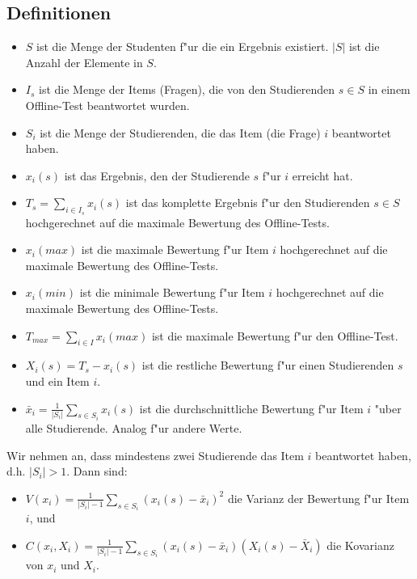 \documentclass[12pt]{report}
\begin{document}
\subsection{Definitionen}
\label{subsubsec:definitions}
\begin{itemize}
\item $S$ ist die Menge der Studenten f"ur die ein Ergebnis existiert. $|S|$ ist die Anzahl der Elemente in $S$.
\item $I_s$ ist die Menge der Items (Fragen), die von den Studierenden $s\in S$ in einem Offline-Test beantwortet wurden.
\item $S_i$ ist die Menge der Studierenden, die das Item (die Frage) $i$ beantwortet haben.
\item $x_i(s)$ ist das Ergebnis, den der Studierende $s$ f"ur $i$ erreicht hat.
\item $T_s = \sum\limits_{i\in I_s} x_i(s)$ ist das komplette Ergebnis f"ur den Studierenden $s\in S$ hochgerechnet auf die maximale Bewertung des Offline-Tests.
\item $x_i(max)$ ist die maximale Bewertung f"ur Item $i$ hochgerechnet auf die maximale Bewertung des Offline-Tests. 
\item $x_i(min)$ ist die minimale Bewertung f"ur Item $i$ hochgerechnet auf die maximale Bewertung des Offline-Tests. 
\item $T_{max}=\sum\limits_{i\in I} x_i(max)$ ist die maximale Bewertung f"ur den Offline-Test.
\item $X_i(s) = T_s - x_i(s)$ ist die restliche Bewertung f"ur einen Studierenden $s$ und ein Item $i$.
\item $\bar{x}_i = \frac{1}{|S_i|}\sum\limits_{s\in S_i}x_i(s)$ ist die durchschnittliche Bewertung f"ur Item $i$ "uber alle Studierende. Analog f"ur andere Werte.
\end{itemize}

Wir nehmen an, dass mindestens zwei Studierende das Item $i$ beantwortet haben, d.h. $|S_i| > 1$.
Dann sind:
\begin{itemize}
\item $V(x_i) = \frac{1}{|S_i| - 1}\sum\limits_{s\in S_i} (x_i(s) - \bar{x}_i)^2$ die Varianz der Bewertung f"ur Item $i$, und
\item $C(x_i, X_i) = \frac{1}{|S_i| - 1}\sum\limits_{s\in S_i}(x_i(s) - \bar{x}_i)(X_i(s) - \bar{X}_i)$ die Kovarianz von $x_i$ und $X_i$.
\end{itemize}

\ \\
\end{document}
